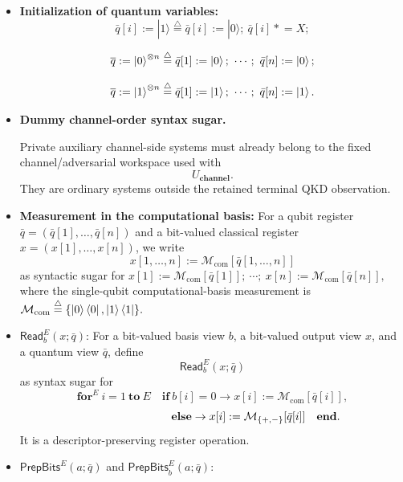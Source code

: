 \documentclass[acmsmall,screen,review,anonymous,nonacm]{acmart}
\theoremstyle{defn_style}
\newcommand{\asteq}{\mathrel{*}=}
\begin{document}
\begin{itemize}

    \item \textbf{Initialization of quantum variables:}
    \[
    \bar q[i]:=|1\rangle\stackrel{\triangle}{=}
    \bar q[i]:=|0\rangle;\ \bar q[i]\asteq X;
    \]
    
    \[
    \overline{q} := \ket{0}^{\otimes n}
    \stackrel{\triangle}{=}
    \bar{q}[1] := \ket{0};\ \cdots;\ \bar{q}[n] := \ket{0};\]

    \[
    \overline{q} := \ket{1}^{\otimes n}
    \stackrel{\triangle}{=}
    \bar{q}[1] := \ket{1};\ \cdots;\ \bar{q}[n] := \ket{1}.\]

    \item {\textbf{Dummy channel-order syntax sugar.}}
    
    {Private auxiliary channel-side systems must already belong
    to the fixed channel/adversarial workspace used with}
    \[
    {
    U_{\textbf{channel}}.
    }
    \]
    {They are ordinary systems outside the retained terminal QKD
    observation.}
    
    \item \textbf{Measurement in the computational basis:}
    For a qubit register
    \(\bar q=(\bar q[1],\ldots,\bar q[n])\)
    and a bit-valued classical register
    \(x=(x[1],\ldots,x[n])\), we write
    \[
    x[1,\ldots,n]
    :=
    \mathcal M_{\mathrm{com}}[\bar q[1,\ldots,n]]\]
    as syntactic sugar for
    \(x[1]:=\mathcal M_{\mathrm{com}}[\bar q[1]];
    \ \cdots;\
    x[n]:=\mathcal M_{\mathrm{com}}[\bar q[n]],\)
    where the single-qubit computational-basis measurement is
    \(\mathcal M_{\mathrm{com}}
    \stackrel{\triangle}{=}
    \{\ket 0\bra 0,\ket 1\bra 1\}.\)

    \item \(\mathsf{Read}_{b}^{E}(x;\bar q)\):
    For a bit-valued basis view \(b\), a bit-valued output view \(x\), and a
    quantum view \(\bar q\), define
    \[
    \mathsf{Read}_{b}^{E}(x;\bar q)
    \]
    as syntax sugar for
    \[
    \mathbf{for}^{E}\ i=1\ \mathbf{to}\ E
    \quad
    \mathbf{if}\ b[i]=0
    \rightarrow
    x[i]:=\mathcal M_{\mathrm{com}}[\bar q[i]],
    \]
    \[
    \hspace{27mm}
    \mathbf{else}
    \rightarrow
    x[i]:=\mathcal M_{\{+,-\}}[\bar q[i]]
    \quad
    \mathbf{end}.
    \]
    It is a descriptor-preserving register operation.

    \item \(\mathsf{PrepBits}^{E}(a;\bar q)\) and
    \(\mathsf{PrepBits}^{E}_{b}(a;\bar q)\):


\end{itemize}
\end{document}
